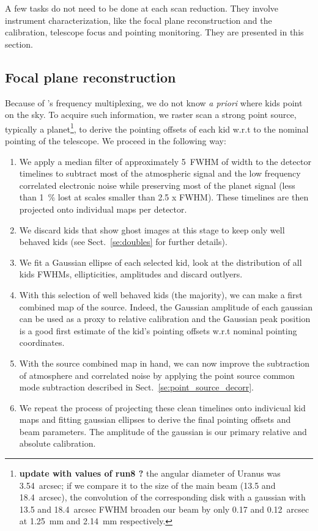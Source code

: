 

A few tasks do not need to be done at each scan reduction. They involve
instrument characterization, like the focal plane reconstruction and the
calibration, telescope focus and pointing monitoring. They are presented in this
section.

\subsection{Focal plane reconstruction}

Because of \nika's frequency multiplexing, we do not know {\it a priori} where
kids point on the sky. To acquire such information, we raster scan a strong
point source, typically a planet\footnote{{\bf update with values of run8 ?} the
  angular diameter of Uranus was 3.54~arcsec; if we compare it to the size of
  the main beam (13.5 and 18.4~arcsec), the convolution of the corresponding
  disk with a gaussian with 13.5 and 18.4~arcsec FWHM broaden our beam by only
  0.17 and 0.12~arcsec at 1.25~mm and 2.14~mm respectively.}, to derive the
pointing offsets of each kid w.r.t to the nominal pointing of the telescope. We
proceed in the following way:

\begin{enumerate}
\item We apply a median filter of approximately 5~FWHM of width to the detector
  timelines to subtract most of the atmospheric signal and the low frequency
  correlated electronic noise while preserving most of the planet signal (less
  than 1~\% lost at scales smaller than 2.5 x FWHM). These timelines are then
  projected onto individual maps per detector.
\item We discard kids that show ghost images at this stage to keep only well
  behaved kids (see Sect.~\ref{se:doubles} for further details).
\item We fit a Gaussian ellipse of each selected kid, look at the distribution
  of all kids FWHMs, ellipticities, amplitudes and discard outlyers.
\item With this selection of well behaved kids (the majority), we can make a
  first combined map of the source. Indeed, the Gaussian amplitude of each
  gaussian can be used as a proxy to relative calibration and the Gaussian peak
  position is a good first estimate of the kid's pointing offsets w.r.t nominal
  pointing coordinates.
\item With the source combined map in hand, we can now improve the subtraction
  of atmosphere and correlated noise by applying the point source common mode
  subtraction described in Sect.~\ref{se:point_source_decorr}.
\item We repeat the process of projecting these clean timelines onto indivicual
  kid maps and fitting gaussian ellipses to derive the final pointing offsets
  and beam parameters. The amplitude of the gaussian is our primary relative and
  absolute calibration.
\end{enumerate}

